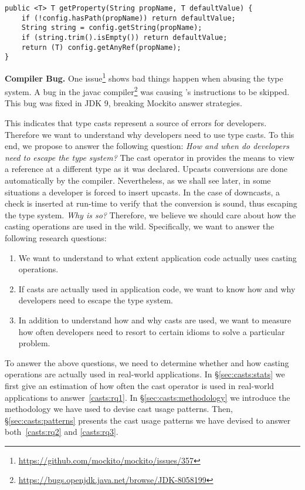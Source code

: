\begin{lstlisting}[style=java]
public <T> T getProperty(String propName, T defaultValue) {
    if (!config.hasPath(propName)) return defaultValue;
    String string = config.getString(propName);
    if (string.trim().isEmpty()) return defaultValue;
    return (T) config.getAnyRef(propName);
}
\end{lstlisting}

\textbf{Compiler Bug.}
One issue\footnote{\url{https://github.com/mockito/mockito/issues/357}} shows bad things happen when abusing the type system.
A bug in the \textsf{javac} compiler\footnote{\url{https://bugs.openjdk.java.net/browse/JDK-8058199}} was causing \jvm{}'s  instructions to be skipped.
This bug was fixed in JDK 9, breaking Mockito answer strategies.

This indicates that type casts represent a source of errors for developers.
Therefore we want to understand why developers need to use type casts.
To this end, we propose to answer the following question:
\emph{How and when do developers need to escape the type system?}
The cast operator in \java{} provides the means to view a reference at a different type as it was declared.
Upcasts conversions are done automatically by the compiler.
Nevertheless, as we shall see later, in some situations a developer is forced to insert upcasts.
In the case of downcasts, a check is inserted at run-time to verify that the conversion is sound, thus escaping the type system.
\emph{Why is so?}
Therefore, we believe we should care about how the casting operations are used in the wild.
Specifically, we want to answer the following research questions:

\begin{enumerate}[label=$CRQ\arabic*:$,ref=$CRQ\arabic*$,leftmargin=3.4\parindent]
\item\label{enum:rq1}{\bf \crqA}
We want to understand to what extent application code actually uses casting operations.
\item\label{enum:rq2}{\bf \crqB}
If casts are actually used in application code, we want to know how and why developers need to escape the type system.
\item\label{enum:rq3}{\bf \crqC}
In addition to understand how and why casts are used, we want to measure how often developers need to resort to certain idioms to solve a particular problem.
\end{enumerate}

To answer the above questions, we need to determine whether and how casting operations are actually used in real-world \java{} applications.
In \S\ref{sec:casts:stats} we first give an estimation of how often the cast operator is used in real-world applications to answer~\ref{casts:rq1}.
In \S\ref{sec:casts:methodology} we introduce the methodology we have used to devise cast usage patterns.
Then, \S\ref{sec:casts:patterns} presents the cast usage patterns we have devised to answer both~\ref{casts:rq2} and \ref{casts:rq3}.




